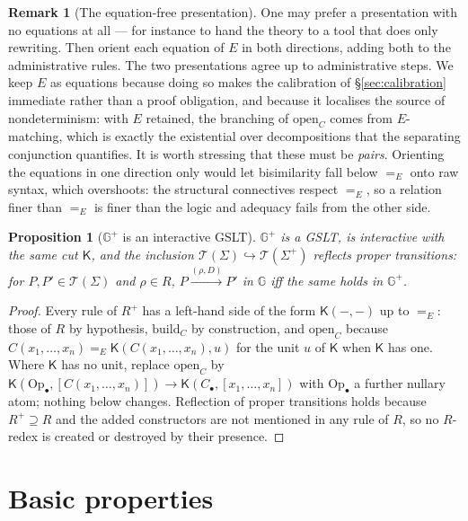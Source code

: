 \documentclass[11pt]{article}
\theoremstyle{plain}
\newtheorem{proposition}[theorem]{Proposition}
\theoremstyle{definition}
\newtheorem{remark}[theorem]{Remark}
\newcommand{\Kc}{\mathsf{K}}
\newcommand{\Gg}{\mathbb{G}}
\newcommand{\op}{\mathrm{open}}
\newcommand{\bd}{\mathrm{build}}
\newcommand{\Terms}{\mathcal{T}}
\begin{document}
\begin{remark}[The equation-free presentation]
\label{rem:pairs}
One may prefer a presentation with no equations at all --- for instance to hand the theory to a tool
that does only rewriting. Then orient each equation of $E$ in both directions, adding both to the
administrative rules. The two presentations agree up to administrative steps. We keep $E$ as equations
because doing so makes the calibration of \S\ref{sec:calibration} immediate rather than a proof
obligation, and because it localises the source of nondeterminism: with $E$ retained, the branching of
$\op_C$ comes from $E$-matching, which is exactly the existential over decompositions that the
separating conjunction quantifies. It is worth stressing that these must be \emph{pairs}. Orienting
the equations in one direction only would let bisimilarity fall below $=_E$ onto raw syntax, which
overshoots: the structural connectives respect $=_E$, so a relation finer than $=_E$ is finer than the
logic and adequacy fails from the other side.
\end{remark}

\begin{proposition}[$\Gg^+$ is an interactive GSLT]
\label{prop:still}
$\Gg^+$ is a GSLT, is interactive with the same cut $\Kc$, and the inclusion
$\Terms(\Sigma) \hookrightarrow \Terms(\Sigma^+)$ reflects proper transitions: for
$P, P' \in \Terms(\Sigma)$ and $\rho \in R$, $P \xrightarrow{(\rho,D)} P'$ in $\Gg$ iff the same holds
in $\Gg^+$.
\end{proposition}

\begin{proof}
Every rule of $R^+$ has a left-hand side of the form $\Kc(-,-)$ up to $=_E$: those of $R$ by hypothesis,
$\bd_C$ by construction, and $\op_C$ because $C(x_1,\dots,x_n) =_E \Kc(C(x_1,\dots,x_n), u)$ for the
unit $u$ of $\Kc$ when $\Kc$ has one. Where $\Kc$ has no unit, replace $\op_C$ by
$\Kc(\mathrm{Op}_\bullet, [C(x_1,\dots,x_n)]) \to \Kc(C_\bullet, [x_1,\dots,x_n])$ with
$\mathrm{Op}_\bullet$ a further nullary atom; nothing below changes. Reflection of proper transitions
holds because $R^+ \supseteq R$ and the added constructors are not mentioned in any rule of $R$, so no
$R$-redex is created or destroyed by their presence.
\end{proof}

\section{Basic properties}
\label{sec:basic}
\end{document}
